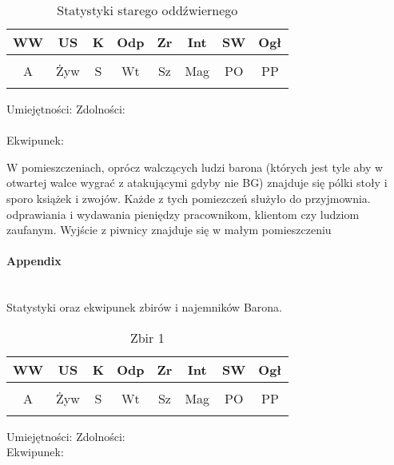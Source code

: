 \documentclass{article}
\begin{document}
\begin{table}[h]
    \caption{Statystyki starego oddźwiernego}
    \centering
        \begin{tabular}{|c|c|c|c|c|c|c|c|}
            \hline
            WW & US & K & Odp & Zr & Int & SW & Ogł \\ \hline
             &  &  &  &  &  &  &  \\ \hline
            A & Żyw & S & Wt & Sz & Mag & PO & PP \\ \hline
             &  &  &  &  &  &  &  \\ \hline
            \end{tabular}
\end{table}
\noindent
Umiejętności:
\hspace{150pt}
Zdolności:\\
\vspace{50pt}\\
Ekwipunek:\\
\vspace{50pt}

W pomieszczeniach, oprócz walczących ludzi barona (których jest tyle aby w otwartej walce wygrać z atakującymi gdyby nie BG) znajduje się pólki stoły i sporo książek i zwojów. Każde z tych pomiezczeń służyło do przyjmownia. odprawiania i wydawania pieniędzy pracownikom, klientom czy ludziom zaufanym. Wyjście z piwnicy znajduje się w małym pomieszczeniu 

\pagebreak
\centering
\paragraph{\Large{Appendix}}\mbox{}\\
Statystyki oraz ekwipunek zbirów i najemników Barona.
\begin{table}[h]
    \caption{Zbir 1}
    \centering
        \begin{tabular}{|c|c|c|c|c|c|c|c|}
            \hline
            WW & US & K & Odp & Zr & Int & SW & Ogł \\ \hline
             &  &  &  &  &  &  &  \\ \hline
            A & Żyw & S & Wt & Sz & Mag & PO & PP \\ \hline
             &  &  &  &  &  &  &  \\ \hline
            \end{tabular}
\end{table}

\raggedright

\noindent
Umiejętności:
\hspace{150pt}
Zdolności:\\
\vspace{50pt}
Ekwipunek:
\vspace{50pt}
\end{document}
